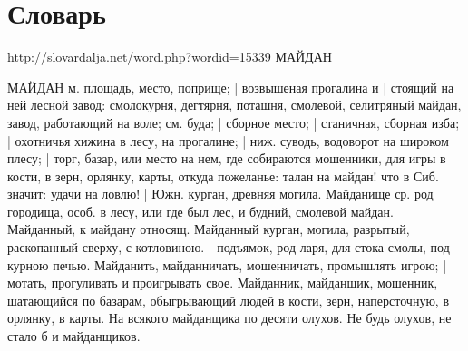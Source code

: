  
 
 
 
 
\chapter{Словарь}
\label{sec:slovar}

\url{http://slovardalja.net/word.php?wordid=15339}
МАЙДАН

МАЙДАН м. площадь, место, поприще; | возвышеная прогалина и | стоящий на ней
лесной завод: смолокурня, дегтярня, поташня, смолевой, селитряный майдан,
завод, работающий на воле; см. буда; | сборное место; | станичная, сборная
изба; | охотничья хижина в лесу, на прогалине; | ниж. суводь, водоворот на
широком плесу; | торг, базар, или место на нем, где собираются мошенники, для
игры в кости, в зерн, орлянку, карты, откуда пожеланье: талан на майдан! что в
Сиб. значит: удачи на ловлю! | Южн. курган, древняя могила. Майданище ср. род
городища, особ. в лесу, или где был лес, и будний, смолевой майдан. Майданный,
к майдану относящ. Майданный курган, могила, разрытый, раскопанный сверху, с
котловиною. - подъямок, род ларя, для стока смолы, под курною печью. Майданить,
майданничать, мошенничать, промышлять игрою; | мотать, прогуливать и
проигрывать свое. Майданник, майданщик, мошенник, шатающийся по базарам,
обыгрывающий людей в кости, зерн, наперсточную, в орлянку, в карты. На всякого
майданщика по десяти олухов. Не будь олухов, не стало б и майданщиков.

